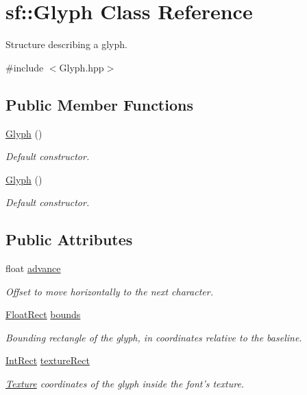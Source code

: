 \hypertarget{classsf_1_1_glyph}{\section{sf\-:\-:Glyph Class Reference}
\label{classsf_1_1_glyph}
}


Structure describing a glyph.  




{\ttfamily \#include $<$Glyph.\-hpp$>$}

\subsection*{Public Member Functions}
\begin{DoxyCompactItemize}
\item 
\hyperlink{classsf_1_1_glyph_ab15cfc37eb7b40a94b3b3aedf934010b}{Glyph} ()
\begin{DoxyCompactList}\small\item\em Default constructor. \end{DoxyCompactList}\item 
\hyperlink{classsf_1_1_glyph_ab15cfc37eb7b40a94b3b3aedf934010b}{Glyph} ()
\begin{DoxyCompactList}\small\item\em Default constructor. \end{DoxyCompactList}\end{DoxyCompactItemize}
\subsection*{Public Attributes}
\begin{DoxyCompactItemize}
\item 
float \hyperlink{classsf_1_1_glyph_aeac19b97ec11409147191606b784deda}{advance}
\begin{DoxyCompactList}\small\item\em Offset to move horizontally to the next character. \end{DoxyCompactList}\item 
\hyperlink{namespacesf_ab0d978f5903922a6bdfca1736b71ccc9}{Float\-Rect} \hyperlink{classsf_1_1_glyph_a6f3c892093167914adc31e52e5923f4b}{bounds}
\begin{DoxyCompactList}\small\item\em Bounding rectangle of the glyph, in coordinates relative to the baseline. \end{DoxyCompactList}\item 
\hyperlink{namespacesf_a1b1279ab06950b96686cffaacb72fed5}{Int\-Rect} \hyperlink{classsf_1_1_glyph_a0d502d326449f8c49011ed91d2805f5b}{texture\-Rect}
\begin{DoxyCompactList}\small\item\em \hyperlink{classsf_1_1_texture}{Texture} coordinates of the glyph inside the font's texture. \end{DoxyCompactList}\end{DoxyCompactItemize}


